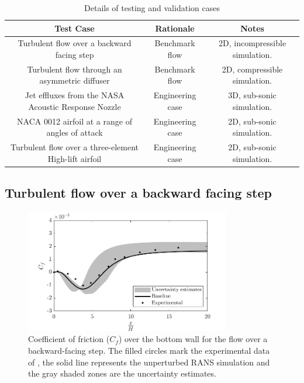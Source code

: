 \begin{table}
\caption{\label{tab:vandv_cases} Details of testing and validation cases}
\begin{center}
\begin{tabular}{ccc}
Test Case& Rationale& Notes \\\hline
Turbulent flow over a backward facing step& Benchmark flow& 2D, incompressible simulation.\\
Turbulent flow through an asymmetric diffuser& Benchmark flow& 2D, compressible simulation.\\
Jet effluxes from the NASA Acoustic Response Nozzle& Engineering case & 3D, sub-sonic simulation.\\
NACA 0012 airfoil at a range of angles of attack& Engineering case& 2D, sub-sonic simulation.\\
Turbulent flow over a three-element High-lift airfoil& Engineering case& 2D, sub-sonic simulation.\\
\end{tabular}
\end{center}
\end{table}

\subsection{Turbulent flow over a backward facing step}



\begin{figure}
\centering
\includegraphics[width=0.8\textwidth]{code/image_gen/backstep/images/backstep_cf_bot.png}
\caption{Coefficient of friction ($C_f$) over the bottom wall for the flow over a backward-facing step. The filled circles mark the experimental data of \cite{driver1985}, the solid line represents the unperturbed RANS simulation and the gray shaded zones are the uncertainty estimates.\label{fig:backstep_cf}}
\end{figure}

